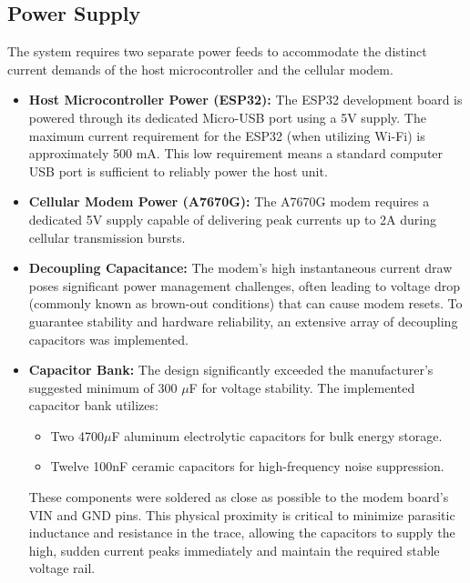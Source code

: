 \subsection{Power Supply}
\label{ssec:power}
The system requires two separate power feeds to accommodate the distinct current demands of the host microcontroller and the cellular modem.

\begin{itemize}
    \item \textbf{Host Microcontroller Power (ESP32):} The ESP32 development board is powered through its dedicated Micro-USB port using a 5V supply. The maximum current requirement for the ESP32 (when utilizing Wi-Fi) is approximately 500 mA. This low requirement means a standard computer USB port is sufficient to reliably power the host unit.

    \item \textbf{Cellular Modem Power (A7670G):} The A7670G modem requires a dedicated 5V supply capable of delivering peak currents up to 2A during cellular transmission bursts.

    \item \textbf{Decoupling Capacitance:} The modem's high instantaneous current draw poses significant power management challenges, often leading to voltage drop (commonly known as brown-out conditions) that can cause modem resets. To guarantee stability and hardware reliability, an extensive array of decoupling capacitors was implemented.

    \item \textbf{Capacitor Bank:} The design significantly exceeded the manufacturer's suggested minimum of 300 $\mu$F for voltage stability. The implemented capacitor bank utilizes:
    \begin{itemize}
        \item Two 4700$\mu$F aluminum electrolytic capacitors for bulk energy storage.
        \item Twelve 100nF ceramic capacitors for high-frequency noise suppression.
    \end{itemize}
    These components were soldered as close as possible to the modem board's VIN and GND pins. This physical proximity is critical to minimize parasitic inductance and resistance in the trace, allowing the capacitors to supply the high, sudden current peaks immediately and maintain the required stable voltage rail.
\end{itemize}

